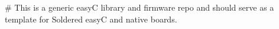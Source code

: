 \# This is a generic easyC library and firmware repo and should serve as a template for Soldered easyC and native boards. 